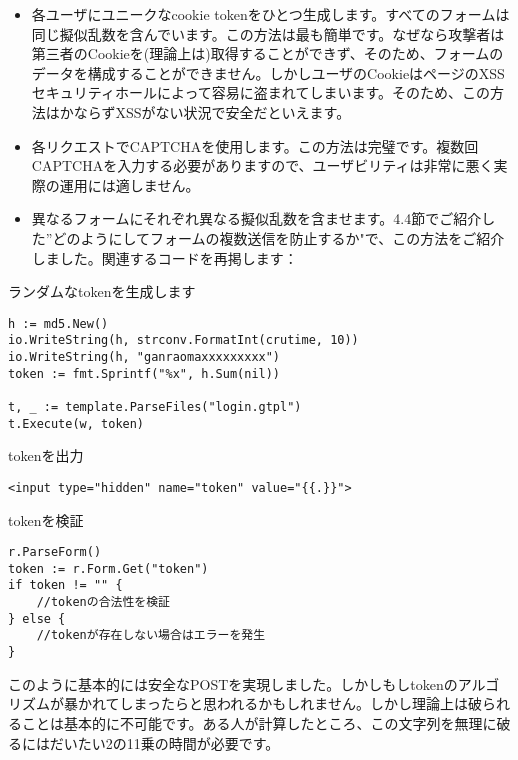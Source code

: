 \begin{itemize}
  \item 各ユーザにユニークなcookie tokenをひとつ生成します。すべてのフォームは同じ擬似乱数を含んでいます。この方法は最も簡単です。なぜなら攻撃者は第三者のCookieを(理論上は)取得することができず、そのため、フォームのデータを構成することができません。しかしユーザのCookieはページのXSSセキュリティホールによって容易に盗まれてしまいます。そのため、この方法はかならずXSSがない状況で安全だといえます。
  \item 各リクエストでCAPTCHAを使用します。この方法は完璧です。複数回CAPTCHAを入力する必要がありますので、ユーザビリティは非常に悪く実際の運用には適しません。
  \item 異なるフォームにそれぞれ異なる擬似乱数を含ませます。4.4節でご紹介した”どのようにしてフォームの複数送信を防止するか"で、この方法をご紹介しました。関連するコードを再掲します：
\end{itemize}

ランダムなtokenを生成します

\begin{lstlisting}[numbers=none]
h := md5.New()
io.WriteString(h, strconv.FormatInt(crutime, 10))
io.WriteString(h, "ganraomaxxxxxxxxx")
token := fmt.Sprintf("%x", h.Sum(nil))

t, _ := template.ParseFiles("login.gtpl")
t.Execute(w, token)
\end{lstlisting}

tokenを出力

\begin{lstlisting}[numbers=none]
<input type="hidden" name="token" value="{{.}}">
\end{lstlisting}

tokenを検証

\begin{lstlisting}[numbers=none]
r.ParseForm()
token := r.Form.Get("token")
if token != "" {
    //tokenの合法性を検証
} else {
    //tokenが存在しない場合はエラーを発生
}
\end{lstlisting}

このように基本的には安全なPOSTを実現しました。しかしもしtokenのアルゴリズムが暴かれてしまったらと思われるかもしれません。しかし理論上は破られることは基本的に不可能です。ある人が計算したところ、この文字列を無理に破るにはだいたい2の11乗の時間が必要です。
